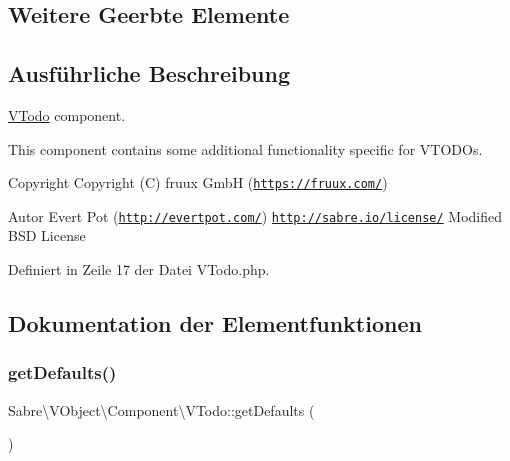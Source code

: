 \subsection*{Weitere Geerbte Elemente}


\subsection{Ausführliche Beschreibung}
\mbox{\hyperlink{class_sabre_1_1_v_object_1_1_component_1_1_v_todo}{V\+Todo}} component.

This component contains some additional functionality specific for V\+T\+O\+D\+Os.

\begin{DoxyCopyright}{Copyright}
Copyright (C) fruux GmbH (\href{https://fruux.com/}{\tt https\+://fruux.\+com/}) 
\end{DoxyCopyright}
\begin{DoxyAuthor}{Autor}
Evert Pot (\href{http://evertpot.com/}{\tt http\+://evertpot.\+com/})  \href{http://sabre.io/license/}{\tt http\+://sabre.\+io/license/} Modified B\+SD License 
\end{DoxyAuthor}


Definiert in Zeile 17 der Datei V\+Todo.\+php.



\subsection{Dokumentation der Elementfunktionen}
\mbox{\label{class_sabre_1_1_v_object_1_1_component_1_1_v_todo_a8e729cac6b23ca5467e80ce9f7841110}} 
\subsubsection{\texorpdfstring{get\+Defaults()}{getDefaults()}}
{\footnotesize\ttfamily Sabre\textbackslash{}\+V\+Object\textbackslash{}\+Component\textbackslash{}\+V\+Todo\+::get\+Defaults (\begin{DoxyParamCaption}{ }\end{DoxyParamCaption})\hspace{0.3cm}{\ttfamily [protected]}}

